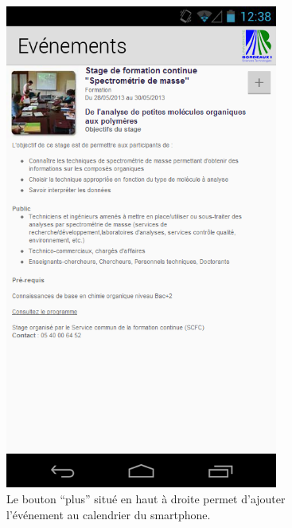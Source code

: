 \documentclass [pdftex,12pt] {report}
\begin{document}
\begin{figure}
\begin{minipage}[t]{8cm}
    \includegraphics[width=0.8\textwidth]{resources/ui_preview/04}
    \caption{Le bouton ``plus'' situé en haut à droite permet d'ajouter l’événement au calendrier du smartphone.}
    \label{fig:04}
  \end{minipage}
  \hspace{-60pt}
\end{figure}
\end{document}
